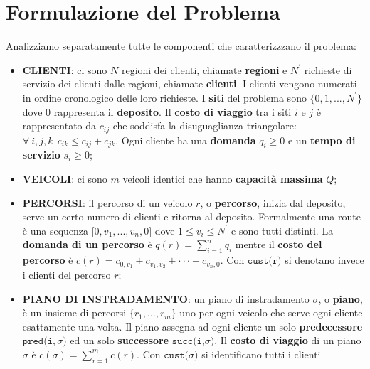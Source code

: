 \documentclass[
]{article}
\providecommand{\tightlist}{%
  \setlength{\itemsep}{0pt}\setlength{\parskip}{0pt}}
\begin{document}
\hypertarget{formulazione-del-problema}{%
\section{Formulazione del Problema}\label{formulazione-del-problema}}

Analizziamo separatamente tutte le componenti che caratterizzzano il
problema:

\begin{itemize}
\tightlist
\item
  \textbf{CLIENTI}: ci sono {\(N\)} regioni dei clienti, chiamate
  \textbf{regioni} e {\(N^{\prime}\)} richieste di servizio dei clienti
  dalle ragioni, chiamate \textbf{clienti}. I clienti vengono numerati
  in ordine cronologico delle loro richieste. I \textbf{siti} del
  problema sono {\(\{ 0,1,...,N^{\prime}\}\)} dove {\(0\)} rappresenta
  il \textbf{deposito}. Il \textbf{costo di viaggio} tra i siti {\(i\)}
  e {\(j\)} è rappresentato da {\(c_{ij}\)} che soddisfa la
  disuguaglianza triangolare:
  {\(\forall\ i,j,k\ \ c_{ik} \leq c_{ij} + c_{jk}\)}. Ogni cliente ha
  una \textbf{domanda} {\(q_{i} \geq 0\)} e un \textbf{tempo di
  servizio} {\(s_{i} \geq 0\)};
\item
  \textbf{VEICOLI}: ci sono {\(m\)} veicoli identici che hanno
  \textbf{capacità massima} {\(Q\)};
\item
  \textbf{PERCORSI}: il percorso di un veicolo {\(r\)}, o
  \textbf{percorso}, inizia dal deposito, serve un certo numero di
  clienti e ritorna al deposito. Formalmente una route è una sequenza
  {\(\lbrack 0,v_{1},...,v_{n},0\rbrack\)} dove
  {\(1 \leq v_{i} \leq N^{\prime}\)} e sono tutti distinti. La
  \textbf{domanda di un percorso} è
  {\(q(r) = \sum\limits_{i = 1}^{n}q_{i}\)} mentre il \textbf{costo del
  percorso} è
  {\(c(r) = c_{0,v_{1}} + c_{v_{1},v_{2}} + \cdot \cdot \cdot + c_{v_{n},0}\)}.
  Con {\(\texttt{cust(r)}\)} si denotano invece i clienti del percorso {\(r\)};
\item
  \textbf{PIANO DI INSTRADAMENTO}: un piano di instradamento
  {\(\sigma\)}, o \textbf{piano}, è un insieme di percorsi
  {\(\{ r_{1},...,r_{m}\}\)} uno per ogni veicolo che serve ogni cliente
  esattamente una volta. Il piano assegna ad ogni cliente un solo
  \textbf{predecessore} {\(\texttt{pred(i},\sigma\texttt{)}\)} ed un
  solo \textbf{successore} {\(\texttt{succ(i,}\sigma\texttt{)}\)}. Il
  \textbf{costo di viaggio} di un piano {\(\sigma\)} è
  {\(c(\sigma) = \sum\limits_{r = 1}^{m}c(r)\)}. Con
  {\(\texttt{cust(}\sigma\texttt{)}\)} si identificano tutti i clienti

\end{itemize}
\end{document}
